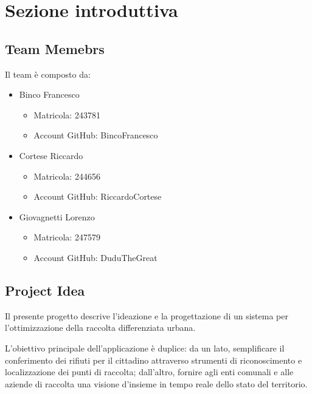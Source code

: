 \documentclass[12pt,a4paper]{article}
\begin{document}
\newpage
{} %
\tableofcontents
\newpage
{}


\section{Sezione introduttiva}

\subsection{Team Memebrs}

Il team è composto da:
\begin{itemize}
    \item Binco Francesco
    \begin{itemize}
        \item Matricola: 243781
        \item Account GitHub: BincoFrancesco
    \end{itemize}
    \item Cortese Riccardo
    \begin{itemize}
        \item Matricola: 244656
        \item Account GitHub: RiccardoCortese
    \end{itemize}
    \item  Giovagnetti Lorenzo
    \begin{itemize}
        \item Matricola: 247579
        \item Account GitHub: DuduTheGreat

    \end{itemize}
\end{itemize}

\subsection{Project Idea}

Il presente progetto descrive l'ideazione e la progettazione di un sistema per l'ottimizzazione della raccolta differenziata urbana. 

L'obiettivo principale dell'applicazione è duplice: da un lato, semplificare il conferimento dei rifiuti per il cittadino attraverso strumenti di riconoscimento  e localizzazione dei punti di raccolta; dall'altro, fornire agli enti comunali e alle aziende di raccolta una visione d'insieme in tempo reale dello stato del territorio. 
\end{document}
